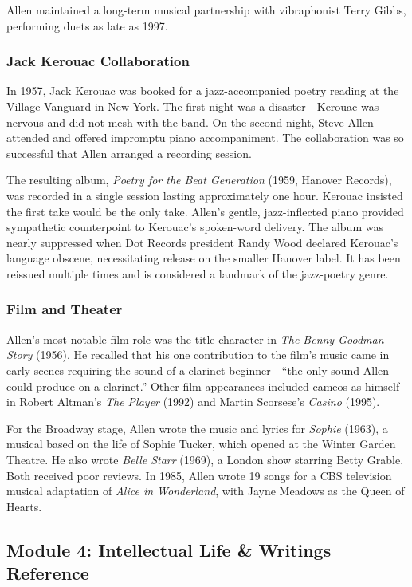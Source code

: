\documentclass[11pt,letterpaper]{article}
\begin{document}
Allen maintained a long-term musical partnership with vibraphonist Terry Gibbs, performing duets as late as 1997.

\subsubsection{Jack Kerouac Collaboration}

In 1957, Jack Kerouac was booked for a jazz-accompanied poetry reading at the Village Vanguard in New York. The first night was a disaster---Kerouac was nervous and did not mesh with the band. On the second night, Steve Allen attended and offered impromptu piano accompaniment. The collaboration was so successful that Allen arranged a recording session.

The resulting album, \textit{Poetry for the Beat Generation} (1959, Hanover Records), was recorded in a single session lasting approximately one hour. Kerouac insisted the first take would be the only take. Allen's gentle, jazz-inflected piano provided sympathetic counterpoint to Kerouac's spoken-word delivery. The album was nearly suppressed when Dot Records president Randy Wood declared Kerouac's language obscene, necessitating release on the smaller Hanover label. It has been reissued multiple times and is considered a landmark of the jazz-poetry genre.

\subsubsection{Film and Theater}

Allen's most notable film role was the title character in \textit{The Benny Goodman Story} (1956). He recalled that his one contribution to the film's music came in early scenes requiring the sound of a clarinet beginner---``the only sound Allen could produce on a clarinet.'' Other film appearances included cameos as himself in Robert Altman's \textit{The Player} (1992) and Martin Scorsese's \textit{Casino} (1995).

For the Broadway stage, Allen wrote the music and lyrics for \textit{Sophie} (1963), a musical based on the life of Sophie Tucker, which opened at the Winter Garden Theatre. He also wrote \textit{Belle Starr} (1969), a London show starring Betty Grable. Both received poor reviews. In 1985, Allen wrote 19 songs for a CBS television musical adaptation of \textit{Alice in Wonderland}, with Jayne Meadows as the Queen of Hearts.

\subsection{Module 4: Intellectual Life \& Writings Reference}
\end{document}
